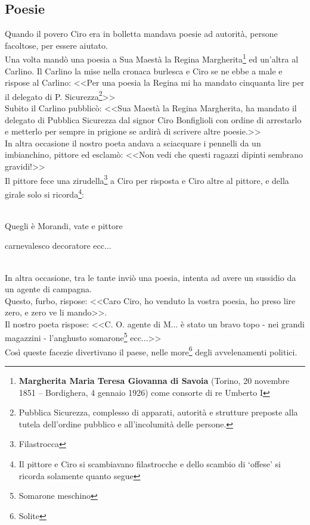 \subsection{Poesie}
Quando il povero Ciro era in bolletta mandava poesie ad autorità, persone facoltose, per essere aiutato.\\
\indent Una volta mandò una poesia a Sua Maestà la Regina Margherita\footnote{\textbf{Margherita Maria Teresa Giovanna di Savoia} (Torino, 20 novembre 1851 – Bordighera, 4 gennaio 1926) come consorte di re Umberto I} ed un'altra al Carlino. Il Carlino la mise nella cronaca burlesca e Ciro se ne ebbe a male e rispose al Carlino: <<Per una poesia la Regina mi ha mandato cinquanta lire per il delegato di P. Sicurezza\footnote{Pubblica Sicurezza, complesso di apparati, autorità e strutture preposte alla tutela dell'ordine pubblico e all'incolumità delle persone.}>>\\
\indent Subito il Carlino pubblicò: <<Sua Maestà la Regina Margherita, ha mandato il delegato di Pubblica Sicurezza dal signor Ciro Bonfiglioli con ordine di arrestarlo e metterlo per sempre in prigione se ardirà di scrivere altre poesie.>>\\
\indent In altra occasione il nostro poeta andava a sciacquare i pennelli da un imbianchino, pittore ed esclamò: <<Non vedi che questi ragazzi dipinti sembrano gravidi!>>\\
\indent Il pittore fece una zirudella\footnote{Filastrocca} a Ciro per risposta e Ciro altre al pittore, e della girale solo si ricorda\footnote{Il pittore e Ciro si scambiavano filastrocche e dello scambio di `offese' si ricorda solamente quanto segue}:\\\\
\textcal \Huge
	\centerline{Quegli è Morandi, vate e pittore}
	\centerline{carnevalesco decoratore ecc...} 
\normalfont \normalsize
\\

In altra occasione, tra le tante inviò una poesia, intenta ad avere un sussidio da un agente di campagna. \\
\indent Questo, furbo, rispose: <<Caro Ciro, ho venduto la vostra poesia, ho preso lire zero, e zero ve li mando>>.\\
\indent Il nostro poeta rispose: <<C. O. agente di M... è stato un bravo topo - nei grandi magazzini - l'anghusto somarone\footnote{Somarone meschino} ecc...>>\\
\indent Così queste facezie divertivano il paese, nelle more\footnote{Solite} degli avvelenamenti politici. 




























%
